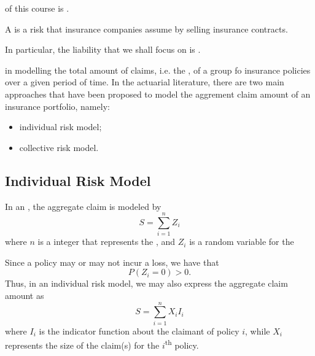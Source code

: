 \documentclass[notoc,notitlepage]{tufte-book}
\begin{document}
 of this course is .

\begin{defn}
\label{defn:liability_risk}
  A  is a risk that insurance companies assume by selling insurance contracts.
\end{defn}

In particular, the liability that we shall focus on is .

 in modelling the total amount of claims, i.e. the , of a group fo insurance policies over a given period of time. In the actuarial literature, there are two main approaches that have been proposed to model the aggrement claim amount of an insurance portfolio, namely:
\begin{itemize}
  \item individual risk model;
  \item collective risk model.
\end{itemize}

\subsection{Individual Risk Model}%
\label{sub:individual_risk_model}

\begin{defn}
\label{defn:individual_risk_model}
  In an , the aggregate claim is modeled by
  \begin{equation*}
    S = \sum_{i=1}^{n} Z_i
  \end{equation*}
  where $n$ is a  integer that represents the , and $Z_i$ is a random variable for the 
\end{defn}

\begin{note}
  Since a policy may or may not incur a loss, we have that
  \begin{equation*}
    P(Z_i = 0) > 0.
  \end{equation*}
  Thus, in an individual risk model, we may also express the aggregate claim amount as
  \begin{equation*}
    S = \sum_{i=1}^{n} X_i I_i
  \end{equation*}
  where $I_i$ is the indicator function about the claimant of policy $i$, while $X_i$ represents the size of the claim(s) for the $i$\textsuperscript{th} policy.
\end{note}
\end{document}

